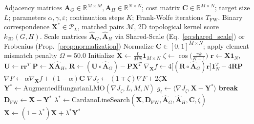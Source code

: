 \documentclass[conference]{IEEEtran}
\begin{document}
\begin{algorithm}[t]
\caption{Fast-WCS Analytical Homotopy and Frank-Wolfe Optimization (Phase 1)}
\label{alg:fast_wcs}
\begin{algorithmic}[1]
\REQUIRE Adjacency matrices $\mathbf{A}_G \in \mathbb{R}^{M \times M}, \mathbf{A}_H \in \mathbb{R}^{N \times N}$; cost matrix $\mathbf{C} \in \mathbb{R}^{M \times N}$; target size $L$; parameters $\alpha, \gamma, \varepsilon$; continuation steps $K$; Frank-Wolfe iterations $T_{\text{FW}}$.
\ENSURE Binary correspondence $\mathbf{X}^* \in \mathcal{P}_L$, matched pairs $\mathcal{M}$, 2D topological kernel score $k_{2\text{D}}(G, H)$.
\STATE Scale matrices $\hat{\mathbf{A}}_G, \hat{\mathbf{A}}_H$ via Shared-Scale (Eq.~\ref{eq:shared_scale}) or Frobenius (Prop.~\ref{prop:normalization})
\STATE Normalize $\mathbf{C} \in [0, 1]^{M \times N}$; apply element mismatch penalty $\Omega = 50.0$
\STATE Initialize $\mathbf{X} \leftarrow \frac{L}{MN}\mathbf{1}_{M \times N}$ 
    \STATE $\zeta \leftarrow \cos\big(\frac{\pi k}{K - 1}\big)$ 
        \STATE $\mathbf{r} \leftarrow \mathbf{X}\mathbf{1}_N$, $\mathbf{U} \leftarrow \mathbf{r}\mathbf{r}^T$ 
        \STATE $\mathbf{P} \leftarrow \mathbf{X}\hat{\mathbf{A}}_H$, $\mathbf{R} \leftarrow (\mathbf{U} \circ \hat{\mathbf{A}}_G) - \mathbf{P}\mathbf{X}^T$ 
        \STATE $\nabla_{\mathbf{X}} f \leftarrow 4\big[(\mathbf{R} \circ \hat{\mathbf{A}}_G)\mathbf{r}\big]\mathbf{1}_N^T - 4\mathbf{R}\mathbf{P}$ 
        \STATE $\nabla F \leftarrow \alpha \nabla_{\mathbf{X}} f + (1 - \alpha)\mathbf{C}$
        \STATE $\nabla J_\zeta \leftarrow (1 \mp \zeta)\nabla F + 2\zeta \mathbf{X}$ 
        \STATE $\mathbf{Y}^* \leftarrow \text{AugmentedHungarianLMO}(\nabla J_\zeta, L, M, N)$
        \STATE $g_t \leftarrow \langle \nabla J_\zeta, \mathbf{X} - \mathbf{Y}^* \rangle$ 
            \STATE \textbf{break} 
        \ENDIF
        \STATE $\mathbf{D}_{\text{FW}} \leftarrow \mathbf{X} - \mathbf{Y}^*$ 
        \STATE $\lambda^* \leftarrow \text{CardanoLineSearch}(\mathbf{X}, \mathbf{D}_{\text{FW}}, \hat{\mathbf{A}}_G, \hat{\mathbf{A}}_H, \mathbf{C}, \zeta)$
        \STATE $\mathbf{X} \leftarrow (1 - \lambda^*)\mathbf{X} + \lambda^* \mathbf{Y}^*$ 

\end{algorithmic}
\end{algorithm}
\end{document}
